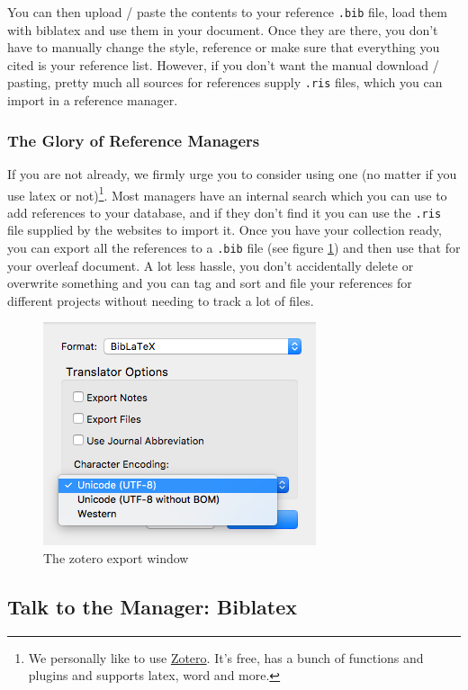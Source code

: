 \documentclass[12pt]{scrarticle}
\begin{document}
You can then upload / paste the contents to your reference \texttt{.bib} file, load them with biblatex and use them in your document. Once  they are there, you don't have to manually change the style, reference or make sure that everything you cited is your reference list. 
However, if you don't want the manual download / pasting, pretty much all sources for references supply \texttt{.ris} files, which you can import in a reference manager.

\subsubsection{The Glory of Reference Managers}
If you are not already, we firmly urge you to consider using one (no matter if you use latex or not)\footnote{We personally like to use \href{https://www.zotero.org/}{Zotero}. It's free, has a bunch of functions and plugins and supports latex, word and more.}. Most managers have an internal search which you can use to add references to your database, and if they don't find it you can use the \texttt{.ris} file supplied by the websites to import it. Once you have your collection ready, you can export all the references to a \texttt{.bib} file (see figure \ref{fig:zotero}) and then use that for your overleaf document. A lot less hassle, you don't accidentally delete or overwrite something and you can tag and sort and file your references for different projects without needing to track a lot of files.

\begin{figure}[h]
    \centering
    \includegraphics[width=.4\textwidth]{zotero_export.png}
    \caption{The zotero export window}
    \label{fig:zotero}
\end{figure}

\subsection{Talk to the Manager: Biblatex}
\end{document}

